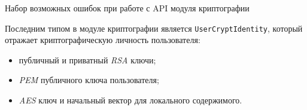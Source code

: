 \begin{code}
	\inputminted{swift}{inc/src/crypto_errors.swift}
   \caption{Набор возможных ошибок при работе с API модуля криптографии}
   \label{sec:development:client:encryption:code:errors}
\end{code}

Последним типом в модуле криптографии является \texttt{UserCryptIdentity}, который отражает криптографическую личность пользователя:
\begin{itemize}
	\item публичный и приватный \textit{RSA} ключи;
	\item \textit{PEM} публичного ключа пользователя;
	\item \textit{AES} ключ и начальный вектор для локального содержимого.
\end{itemize}